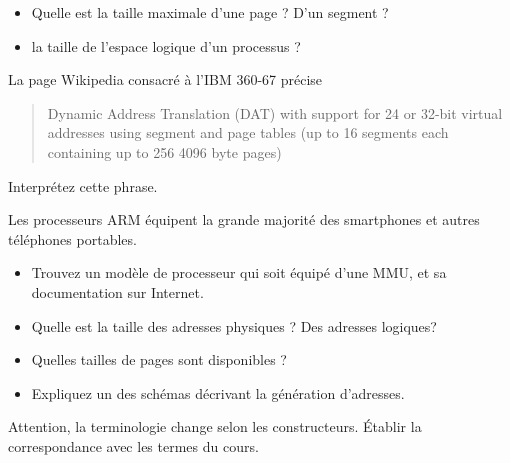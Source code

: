 \begin{multicols}{2}
\begin{exercice}
\begin{itemize}
\item Quelle est la taille maximale d'une page ? D'un segment ? 
\item la taille de l'espace logique d'un processus ?
\end{itemize}
\end{exercice}


\begin{exercice} La page Wikipedia consacré à l'IBM 360-67 précise 
\begin{quote}
Dynamic Address Translation (DAT) with support for 24 or 32-bit
virtual addresses using segment and page tables (up to 16 segments
each containing up to 256 4096 byte pages)
\end{quote}
Interprétez cette phrase.
\end{exercice}


\begin{exercice}
Les processeurs ARM équipent la grande majorité des smartphones et
autres téléphones portables. 
\begin{itemize}
\item Trouvez un modèle de processeur qui soit équipé d'une MMU, et sa documentation sur Internet.
\item Quelle est la taille des adresses physiques ? Des adresses logiques?
\item Quelles tailles de pages sont disponibles ?
\item Expliquez un des schémas décrivant la génération d'adresses.
\end{itemize}
Attention, la terminologie change selon les constructeurs. Établir la correspondance avec les termes du cours.
\end{exercice}
\end{multicols}

